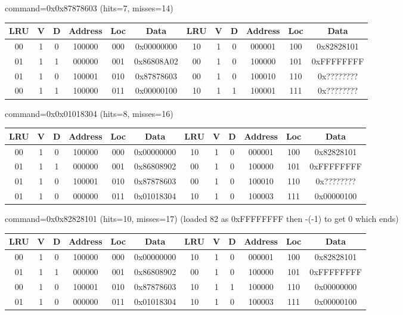 \begin{enumerate}
{    command=0x0x87878603 (hits=7, misses=14)

    \begin{tabular}{|c|c|c|c|c|c||c|c|c|c|c|c|} \hline
    LRU   & V & D & Address & Loc & Data       & LRU   & V & D & Address & Loc & Data        \\ \hline
    00    & 1 & 0 & 100000  & 000 & 0x00000000 & 10    & 1 & 0 & 000001  & 100 & 0x82828101  \\ \hline
    01    & 1 & 1 & 000000  & 001 & 0x86808A02 & 00    & 1 & 0 & 100000  & 101 & 0xFFFFFFFF  \\ \hline
    01    & 1 & 0 & 100001  & 010 & 0x87878603 & 00    & 1 & 0 & 100010  & 110 & 0x????????  \\ \hline
    00    & 1 & 1 & 100000  & 011 & 0x00000100 & 10    & 1 & 1 & 100001  & 111 & 0x????????  \\ \hline
    \end{tabular}


    command=0x0x01018304 (hits=8, misses=16)

    \begin{tabular}{|c|c|c|c|c|c||c|c|c|c|c|c|} \hline
    LRU   & V & D & Address & Loc & Data       & LRU   & V & D & Address & Loc & Data        \\ \hline
    00    & 1 & 0 & 100000  & 000 & 0x00000000 & 10    & 1 & 0 & 000001  & 100 & 0x82828101  \\ \hline
    01    & 1 & 1 & 000000  & 001 & 0x86808902 & 00    & 1 & 0 & 100000  & 101 & 0xFFFFFFFF  \\ \hline
    01    & 1 & 0 & 100001  & 010 & 0x87878603 & 00    & 1 & 0 & 100010  & 110 & 0x????????  \\ \hline
    01    & 1 & 0 & 000000  & 011 & 0x01018304 & 10    & 1 & 0 & 100003  & 111 & 0x00000100  \\ \hline
    \end{tabular}


    command=0x0x82828101 (hits=10, misses=17) (loaded 82 as 0xFFFFFFFF then -(-1) to get 0 which ends)

    \begin{tabular}{|c|c|c|c|c|c||c|c|c|c|c|c|} \hline
    LRU   & V & D & Address & Loc & Data       & LRU   & V & D & Address & Loc & Data        \\ \hline
    00    & 1 & 0 & 100000  & 000 & 0x00000000 & 10    & 1 & 0 & 000001  & 100 & 0x82828101  \\ \hline
    01    & 1 & 1 & 000000  & 001 & 0x86808902 & 00    & 1 & 0 & 100000  & 101 & 0xFFFFFFFF  \\ \hline
    00    & 1 & 0 & 100001  & 010 & 0x87878603 & 10    & 1 & 1 & 100000  & 110 & 0x00000000  \\ \hline
    01    & 1 & 0 & 000000  & 011 & 0x01018304 & 10    & 1 & 0 & 100003  & 111 & 0x00000100  \\ \hline
    \end{tabular}
    }



\end{enumerate}
